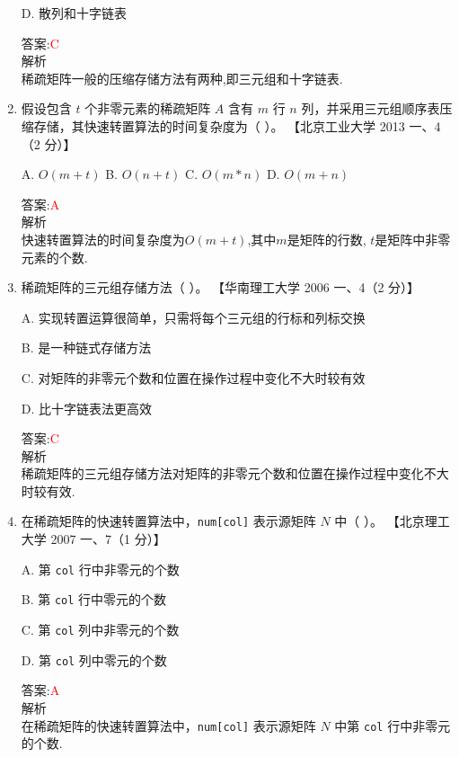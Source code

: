 \documentclass[lang=cn,newtx,10pt,scheme=chinese]{../elegantbook}
\begin{document}
\begin{enumerate}
    D. 散列和十字链表  

    答案:\textcolor{red}{C}\\
    解析\\
    稀疏矩阵一般的压缩存储方法有两种,即三元组和十字链表.\\

    \item 假设包含 $t$ 个非零元素的稀疏矩阵 $A$ 含有 $m$ 行 $n$ 列，并采用三元组顺序表压缩存储，其快速转置算法的时间复杂度为（ ）。  
    【北京工业大学 2013 一、4（2 分）】

    A. $O(m+t)$ \quad B. $O(n+t)$ \quad C. $O(m*n)$ \quad D. $O(m+n)$  

    答案:\textcolor{red}{A}\\
    解析\\
    快速转置算法的时间复杂度为$O(m+t)$,其中$m$是矩阵的行数,
    $t$是矩阵中非零元素的个数.\\
    

    \item 稀疏矩阵的三元组存储方法（ ）。  
    【华南理工大学 2006 一、4（2 分）】  

    A. 实现转置运算很简单，只需将每个三元组的行标和列标交换  

    B. 是一种链式存储方法  

    C. 对矩阵的非零元个数和位置在操作过程中变化不大时较有效  

    D. 比十字链表法更高效  

    答案:\textcolor{red}{C}\\
    解析\\
    稀疏矩阵的三元组存储方法对矩阵的非零元个数和位置在操作过程中变化不大时较有效.\\

    \item 在稀疏矩阵的快速转置算法中，\texttt{num[col]} 表示源矩阵 $N$ 中（ ）。  
    【北京理工大学 2007 一、7（1 分）】  

    A. 第 \texttt{col} 行中非零元的个数  

    B. 第 \texttt{col} 行中零元的个数  

    C. 第 \texttt{col} 列中非零元的个数  

    D. 第 \texttt{col} 列中零元的个数  

    答案:\textcolor{red}{A}\\
    解析\\
    在稀疏矩阵的快速转置算法中，\texttt{num[col]} 表示源矩阵 $N$ 中第 \texttt{col} 行中非零元的个数.\\


\end{enumerate}
\end{document}
